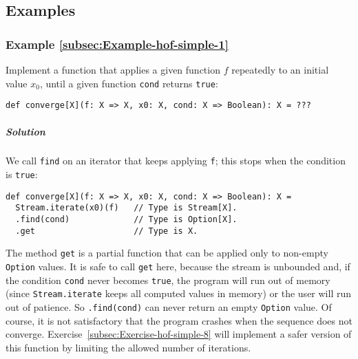 \subsection{Examples}

\subsubsection{Example \label{subsec:Example-hof-simple-1}\ref{subsec:Example-hof-simple-1}}

Implement a function that applies a given function $f$ repeatedly
to an initial value $x_{0}$, until a given function \lstinline!cond!
returns \lstinline!true!:
\begin{lstlisting}
def converge[X](f: X => X, x0: X, cond: X => Boolean): X = ???
\end{lstlisting}


\subparagraph{Solution}

We call \lstinline!find! on an iterator that keeps applying \lstinline!f!;
this stops when the condition is \lstinline!true!:
\begin{lstlisting}
def converge[X](f: X => X, x0: X, cond: X => Boolean): X = 
  Stream.iterate(x0)(f)   // Type is Stream[X].
  .find(cond)             // Type is Option[X].
  .get                    // Type is X.
\end{lstlisting}
The method \lstinline!get! is a partial
function that can be applied only to non-empty \lstinline!Option!
values. It is safe to call \lstinline!get! here, because the stream
is unbounded and, if the condition \lstinline!cond! never becomes
\lstinline!true!, the program will run out of memory (since \lstinline!Stream.iterate!
keeps all computed values in memory) or the user will run out of patience.
So \lstinline!.find(cond)! can never return an empty \lstinline!Option!
value. Of course, it is not satisfactory that the program crashes
when the sequence does not converge. Exercise~\ref{subsec:Exercise-hof-simple-8}
will implement a safer version of this function by limiting the allowed
number of iterations.

